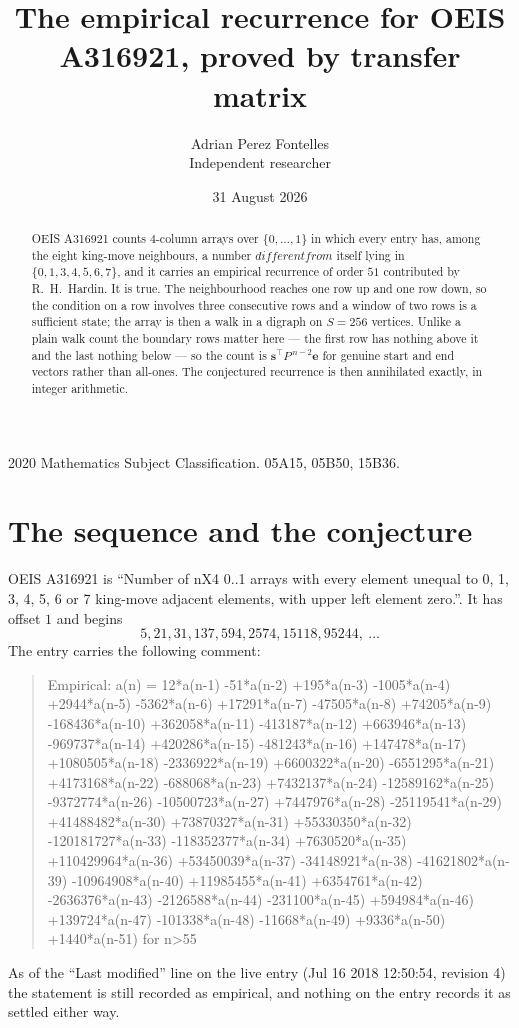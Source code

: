 \documentclass[11pt,a4paper]{article}
\title{The empirical recurrence for OEIS A316921, proved by transfer matrix}
\author{Adrian Perez Fontelles\\ \small Independent researcher}
\date{31 August 2026}
\theoremstyle{plain}
\theoremstyle{definition}
\begin{document}
\maketitle

\begin{abstract}
OEIS A316921 counts $4$-column arrays over $\{0,\dots,1\}$ in which every entry has,
among the eight king-move neighbours, a number $different from$ itself lying in $\{0,1,3,4,5,6,7\}$, and it carries an empirical
recurrence of order $51$ contributed by R.~H.~Hardin. It is true. The neighbourhood
reaches one row up and one row down, so the condition on a row involves three consecutive
rows and a window of two rows is a sufficient state; the array is then a walk in a digraph
on $S=256$ vertices. Unlike a plain walk count the boundary rows matter here --- the first
row has nothing above it and the last nothing below --- so the count is
$\mathbf{s}^{\!\top}P^{\,n-2}\mathbf{e}$ for genuine start and end vectors rather than
all-ones. The conjectured recurrence is then annihilated exactly, in integer arithmetic.
\end{abstract}

\noindent\small 2020 Mathematics Subject Classification. 05A15, 05B50, 15B36.\normalsize

\section{The sequence and the conjecture}

OEIS A316921 is ``Number of nX4 0..1 arrays with every element unequal to 0, 1, 3, 4, 5, 6 or 7 king-move adjacent elements, with upper left element zero.''. It has offset
$1$ and begins
\[
5, 21, 31, 137, 594, 2574, 15118, 95244,\ \dots
\]
The entry carries the following comment:
\begin{quote}\small
Empirical: a(n) = 12*a(n-1) -51*a(n-2) +195*a(n-3) -1005*a(n-4) +2944*a(n-5) -5362*a(n-6) +17291*a(n-7) -47505*a(n-8) +74205*a(n-9) -168436*a(n-10) +362058*a(n-11) -413187*a(n-12) +663946*a(n-13) -969737*a(n-14) +420286*a(n-15) -481243*a(n-16) +147478*a(n-17) +1080505*a(n-18) -2336922*a(n-19) +6600322*a(n-20) -6551295*a(n-21) +4173168*a(n-22) -688068*a(n-23) +7432137*a(n-24) -12589162*a(n-25) -9372774*a(n-26) -10500723*a(n-27) +7447976*a(n-28) -25119541*a(n-29) +41488482*a(n-30) +73870327*a(n-31) +55330350*a(n-32) -120181727*a(n-33) -118352377*a(n-34) +7630520*a(n-35) +110429964*a(n-36) +53450039*a(n-37) -34148921*a(n-38) -41621802*a(n-39) -10964908*a(n-40) +11985455*a(n-41) +6354761*a(n-42) -2636376*a(n-43) -2126588*a(n-44) -231100*a(n-45) +594984*a(n-46) +139724*a(n-47) -101338*a(n-48) -11668*a(n-49) +9336*a(n-50) +1440*a(n-51) for n>55
\end{quote}
As of the ``Last modified'' line on the live entry (Jul 16 2018 12:50:54, revision
4) the statement is still recorded as empirical, and nothing on the entry
records it as settled either way.
\end{document}
